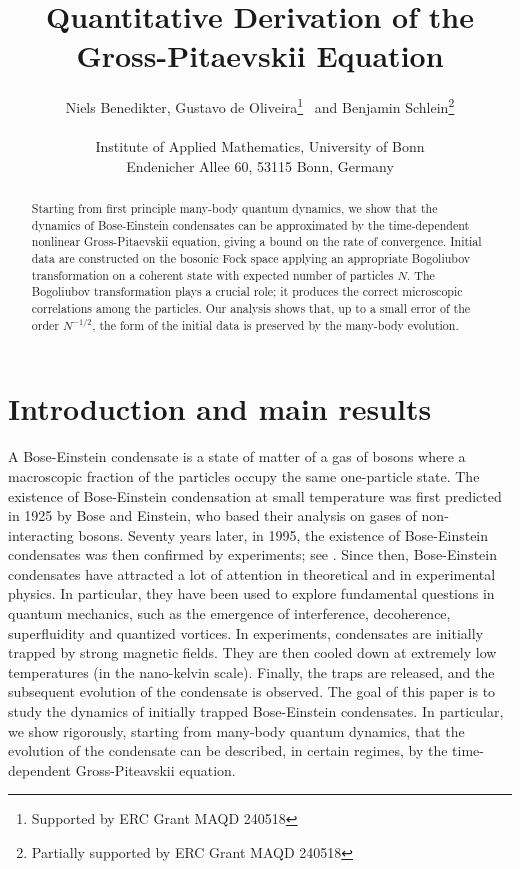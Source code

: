 \documentclass[11pt,a4paper]{article}
\title{Quantitative Derivation of the Gross-Pitaevskii Equation}
\author{Niels Benedikter, Gustavo de Oliveira\thanks{Supported by ERC Grant MAQD 240518 }  \, and Benjamin Schlein\thanks{Partially supported by ERC Grant MAQD 240518} \\ \\ Institute of Applied Mathematics, University of Bonn\\ Endenicher Allee 60, 53115 Bonn, Germany}
\begin{document}
\maketitle

\begin{abstract}
Starting from first principle many-body quantum dynamics, we show that the dynamics of 
Bose-Einstein condensates can be approximated by the time-dependent nonlinear 
Gross-Pitaevskii equation, giving a bound on the rate of convergence. Initial data are constructed on the bosonic Fock space applying an appropriate Bogoliubov transformation on a coherent state with expected number of particles $N$. The Bogoliubov transformation plays a crucial role; it produces the correct microscopic correlations among the particles. Our analysis shows that, up to a small error of the order $N^{-1/2}$, the form of the initial data is preserved by the many-body evolution.  
\end{abstract}

\section{Introduction and main results}
\label{s:intro}


A Bose-Einstein condensate is a state of matter of a gas of bosons where a macroscopic fraction of the particles occupy the same one-particle state. The existence of Bose-Einstein condensation at small temperature was first predicted in 1925 by Bose and Einstein, who based their analysis on gases of non-interacting bosons. Seventy years later, in 1995, the existence of Bose-Einstein condensates 
was then confirmed by experiments; see \cite{BEC1,BEC2}. Since then, Bose-Einstein condensates have attracted a lot of attention in theoretical and in experimental physics. In particular, they have been used to explore fundamental questions in quantum mechanics, such as the emergence of interference, decoherence, superfluidity and quantized vortices. In experiments, condensates are initially trapped by strong magnetic fields. They are then cooled down at extremely low temperatures (in the nano-kelvin scale). Finally, the traps are released, and the subsequent evolution of the condensate is observed. The goal of this paper is to study the dynamics of initially trapped Bose-Einstein condensates. In particular, we 
show rigorously, starting from many-body quantum dynamics, that the evolution of the condensate can be described, in certain regimes, by the time-dependent Gross-Piteavskii equation. 
\end{document}
